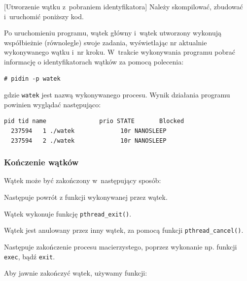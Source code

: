 \begin{example}{[Utworzenie wątku z~pobraniem identyfikatora]}
Należy skompilować, zbudować i~uruchomić poniższy kod. 



Po uruchomieniu programu, wątek główny i~wątek utworzony wykonują współbieżnie (równolegle) swoje zadania, wyświetlając nr aktualnie wykonywanego wątku i~nr kroku. W~trakcie wykonywania programu pobrać informację o identyfikatorach wątków za pomocą polecenia: 

\begin{lstlisting}[style=MyCStyle]
# pidin -p watek
\end{lstlisting}

gdzie \lstinline[style=MyCStyle]{watek} jest nazwą wykonywanego procesu. Wynik działania programu powinien wyglądać następująco: 

\begin{lstlisting}[style=MyCStyle]
     pid tid name               prio STATE       Blocked                     
  237594   1 ./watek             10r NANOSLEEP                               
  237594   2 ./watek             10r NANOSLEEP                                                
\end{lstlisting}

\end{example}


\subsubsection{Kończenie wątków}

Wątek może być zakończony w~następujący sposób: 

\begin{myitemize}
\item Następuje powrót z funkcji wykonywanej przez wątek. 
\item Wątek wykonuje funkcję \lstinline[style=MyCStyle]{pthread_exit()}.
\item Wątek jest anulowany przez inny wątek, za pomocą funkcji \lstinline[style=MyCStyle]{pthread_cancel()}. 
\item Następuje zakończenie procesu macierzystego, poprzez wykonanie np. funkcji \lstinline[style=MyCStyle]{exec}, bądź \lstinline[style=MyCStyle]{exit}. 
\end{myitemize}

Aby jawnie zakończyć  wątek, używamy funkcji: 

